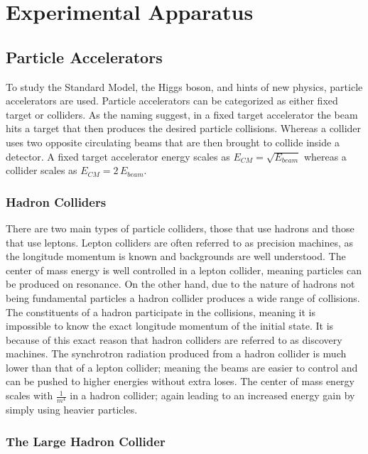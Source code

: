 \chapter{Experimental Apparatus}\label{chap:experiment}

\section{Particle Accelerators}\label{sec:accelerators}

	To study the Standard Model, the Higgs boson, and hints of new physics, particle accelerators are used. Particle accelerators can be categorized as either fixed target or colliders. As the naming suggest, in a fixed target accelerator the beam hits a target that then produces the desired particle collisions. Whereas a collider uses two opposite circulating beams that are then brought to collide inside a detector. A fixed target accelerator energy scales as $E_{CM} = \sqrt{E_{beam}}$ whereas a collider scales as $E_{CM} = 2 \, E_{beam}$. 

	\subsection{Hadron Colliders}\label{ssec:hadron-colliders}

		There are two main types of particle colliders, those that use hadrons and those that use leptons. Lepton colliders are often referred to as precision machines, as the longitude momentum is known and backgrounds are well understood. The center of mass energy is well controlled in a lepton collider, meaning particles can be produced on resonance. On the other hand, due to the nature of hadrons not being fundamental particles a hadron collider produces a wide range of collisions. The constituents of a hadron participate in the collisions, meaning it is impossible to know the exact longitude momentum of the initial state. It is because of this exact reason that hadron colliders are referred to as discovery machines. The synchrotron radiation produced from a hadron collider is much lower than that of a lepton collider; meaning the beams are easier to control and can be pushed to higher energies without extra loses. The center of mass energy scales with $\frac{1}{m^4}$ in a hadron collider; again leading to an increased energy gain by simply using heavier particles.

	\subsection{The Large Hadron Collider}\label{ssec:LHC}

